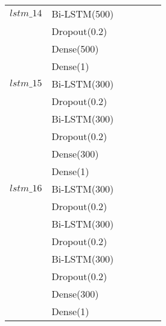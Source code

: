 \begin{longtable}{| c | m{0.58\linewidth} | r | m{0.1\linewidth} |}
    $lstm\_14$  & Bi-LSTM(500)              \\
                & Dropout(0.2)              \\
                & Dense(500)                \\
                & Dense(1)                  \\ \hline

    $lstm\_15$  & Bi-LSTM(300)              \\
                & Dropout(0.2)              \\
                & Bi-LSTM(300)              \\
                & Dropout(0.2)              \\
                & Dense(300)                \\
                & Dense(1)                  \\ \hline

    $lstm\_16$  & Bi-LSTM(300)              \\
                & Dropout(0.2)              \\
                & Bi-LSTM(300)              \\
                & Dropout(0.2)              \\
                & Bi-LSTM(300)              \\
                & Dropout(0.2)              \\
                & Dense(300)                \\
                & Dense(1)                  %
\end{longtable}



